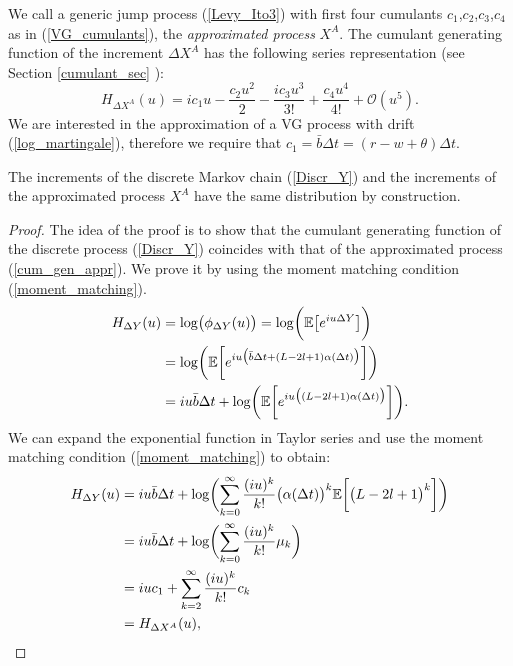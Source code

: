 We call a generic jump process (\ref{Levy_Ito3}) with first four cumulants $c_1$,$c_2$,$c_3$,$c_4$ as in (\ref{VG_cumulants}), 
the \emph{approximated process} $X^A$. 
The cumulant generating function of the increment $\Delta X^A$ has the following series representation (see Section \ref{cumulant_sec} ):
\begin{equation}\label{cum_gen_appr}
 H_{\Delta X^{A}}(u) = ic_1 u -\frac{c_2u^2}{2} -\frac{ic_3u^3}{3!} + \frac{c_4u^4}{4!} + \mathcal{O}(u^5).
\end{equation}
We are interested in the approximation of a VG process with drift (\ref{log_martingale}), therefore we require that $c_1 = \bar b \Delta t = (r-w+\theta)\Delta t$. 
\begin{Theorem}
The increments of the discrete Markov chain (\ref{Discr_Y}) and the increments of the approximated process $X^A$ have the same distribution by construction.
\end{Theorem}
\begin{proof}
The idea of the proof is to show that the cumulant generating function of the discrete process (\ref{Discr_Y}) 
coincides with that of the approximated process (\ref{cum_gen_appr}). We prove it by using the moment
matching condition (\ref{moment_matching}).
\begin{align}
H_{\Delta Y}(u) &= \log \bigl( \phi_{\Delta Y}(u)  \bigr) = \log \biggl( \mathbb{E} \bigl[ e^{iu \Delta Y} \bigr] \biggr) \\ \nonumber
                &= \log \biggl( \mathbb{E} \biggl[ e^{iu \bigl( \bar b \Delta t + (L-2l+1) \alpha(\Delta t) \bigr) } \biggr] \biggr) \\ \nonumber
		&= iu \bar b \Delta t + \log \biggl( \mathbb{E} \biggl[ e^{iu \bigl(  (L-2l+1) \alpha(\Delta t) \bigr) } \biggr] \biggr).
\end{align}
We can expand the exponential function in Taylor series and use the moment matching condition (\ref{moment_matching}) to obtain:
\begin{align}
H_{\Delta Y}(u) &= iu \bar b \Delta t + \log \biggl( \sum_{k=0}^{\infty} \frac{(iu)^k}{k!} 
\bigl(\alpha(\Delta t)\bigr)^k \mathbb{E} \biggl[ \bigl( L-2l+1  \bigr)^k \biggr] \biggr) \\ \nonumber
                &= iu \bar b \Delta t + \log \biggl( \sum_{k=0}^{\infty} \frac{(iu)^k}{k!} \mu_k \biggr) \\ \nonumber
                &= iu c_1 + \sum_{k=2}^{\infty} \frac{(iu)^k}{k!} c_k \\ \nonumber 
                &= H_{\Delta X^{A}}(u),
\end{align}
\end{proof}
